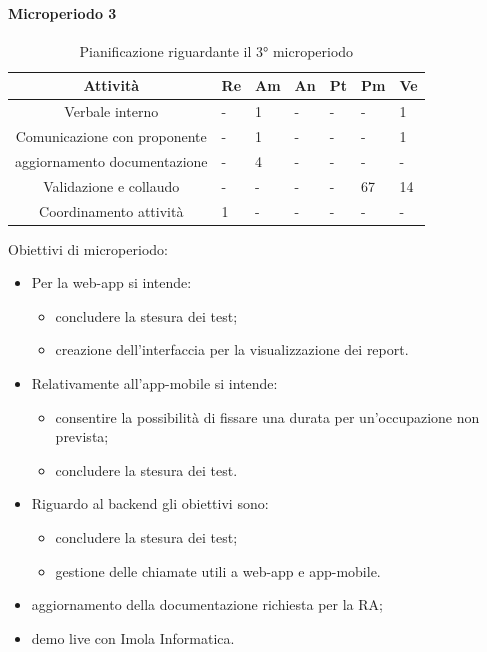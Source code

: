 \paragraph{Microperiodo 3}
\begin{table}[H]
	\centering
	\renewcommand{\arraystretch}{1.5}
	\begin{tabular}{|c|p{10mm}|p{10mm}|p{10mm}|p{10mm}|p{10mm}|p{10mm}|}
		\hline
		\rowcolor{lighter-grayer}
		\textbf{Attività}                         & \textbf{Re} & \textbf{Am} & \textbf{An} & \textbf{Pt} & \textbf{Pm} & \textbf{Ve} \\ \hline
		Verbale interno              & - & 1 & - & - & -  & 1  \\ \hline
		Comunicazione con proponente & -           & 1           & -           & -           & -           & 1           \\ \hline
		aggiornamento documentazione & - & 4 & - & - & -  & -  \\ \hline
		Validazione e collaudo       & - & - & - & - & 67 & 14 \\ \hline
		Coordinamento attività       & 1 & - & - & - & -  & -  \\ \hline
	\end{tabular}
	\caption{ Pianificazione riguardante il 3° microperiodo\\}
\end{table}

Obiettivi di microperiodo:

\begin{itemize}
	\item Per la web-app si intende:
	\begin{itemize}
		\item concludere la stesura dei test;
		\item creazione dell'interfaccia per la visualizzazione dei report.
	\end{itemize}
	\item Relativamente all'app-mobile si intende:
	\begin{itemize}
		\item consentire la possibilità di fissare una durata per un'occupazione non prevista;
		\item concludere la stesura dei test.
	\end{itemize}
	\item Riguardo al backend gli obiettivi sono:
	\begin{itemize}
		\item concludere la stesura dei test;
		\item gestione delle chiamate utili a web-app e app-mobile.
	\end{itemize}
\item aggiornamento della documentazione richiesta per la RA;
\item demo live con Imola Informatica.
\end{itemize}
